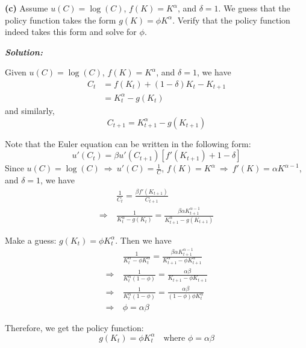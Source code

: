 \documentclass[12pt, letterpaper]{article}
\begin{document}
\vspace{1em}
\noindent\textbf{(c)} Assume $u(C) = \log(C)$, $f(K) = K^{\alpha}$, and $\delta = 1$. We guess that the policy function takes the form $g(K) = \phi K^{\alpha}$. Verify that the policy function indeed takes this form and solve for $\phi$.

\begin{shaded}
\noindent\textbf{\textit{Solution:}}\par
Given $u(C) = \log(C)$, $f(K) = K^{\alpha}$, and $\delta = 1$, we have
\begin{align*}
    C_t & = f(K_t) + (1-\delta)K_t - K_{t+1} \\
    & = K_t^{\alpha} - g(K_t)
\end{align*}
and similarly,
\begin{equation*}
    C_{t+1} = K_{t+1}^{\alpha} - g(K_{t+1})
\end{equation*}

Note that the Euler equation can be written in the following form:
\begin{equation*}
    u'(C_t) = \beta u'(C_{t+1}) [f'(K_{t+1}) + 1 - \delta]
\end{equation*}
Since $u(C) = \log(C)\ \Rightarrow \ u'(C) = \frac{1}{C}$, $f(K) = K^{\alpha} \ \Rightarrow \ f'(K) = \alpha K^{\alpha-1}$, and $\delta = 1$, we have
\begin{align*}
    & \frac{1}{C_t} = \frac{\beta f'(K_{t+1})}{C_{t+1}} \\
    \Rightarrow \ & \frac{1}{K_t^{\alpha} - g(K_t)} = \frac{\beta \alpha K_{t+1}^{\alpha-1}}{K_{t+1}^{\alpha} - g(K_{t+1})}
\end{align*}

Make a guess: $g(K_t) = \phi K_t^{\alpha}$. Then we have
\begin{align*}
    & \frac{1}{K_t^{\alpha} - \phi K_t^{\alpha}} = \frac{\beta \alpha K_{t+1}^{\alpha-1}}{K_{t+1}^{\alpha} - \phi K_{t+1}^{\alpha}} \\
    \Rightarrow \ & \frac{1}{K_t^{\alpha} (1 - \phi)} = \frac{\alpha \beta}{K_{t+1} - \phi K_{t+1}} \\
    \Rightarrow \ & \frac{1}{K_t^{\alpha} (1 - \phi)} = \frac{\alpha \beta}{(1-\phi) \phi K_t^{\alpha}} \\
    \Rightarrow \ & \phi = \alpha \beta
\end{align*}

Therefore, we get the policy function:
\begin{equation*}
    g(K_t) = \phi K_t^{\alpha} \quad \text{where $\phi = \alpha \beta$}
\end{equation*}
\end{shaded}
\end{document}
